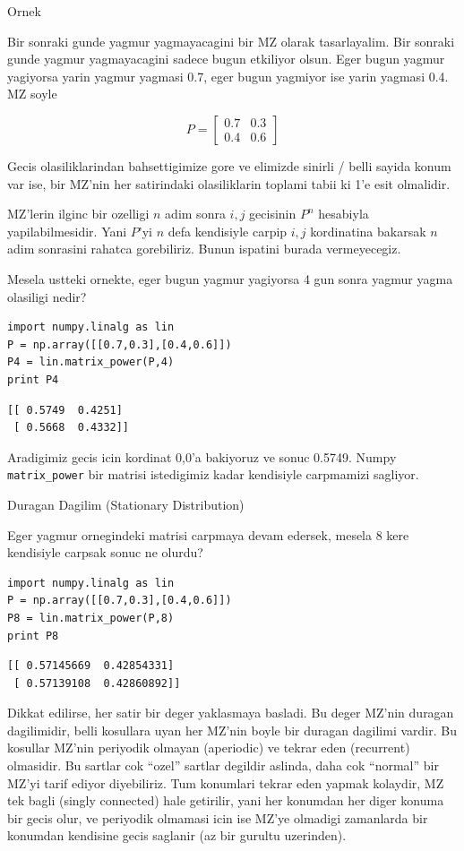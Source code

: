 \documentclass[12pt,fleqn]{article}\usepackage{../common}
\begin{document}
Ornek

Bir sonraki gunde yagmur yagmayacagini bir MZ olarak tasarlayalim. Bir
sonraki gunde yagmur yagmayacagini sadece bugun etkiliyor olsun. Eger bugun
yagmur yagiyorsa yarin yagmur yagmasi 0.7, eger bugun yagmiyor ise yarin
yagmasi 0.4. MZ soyle

$$ 
P =
\left[\begin{array}{cc}
0.7 & 0.3 \\
0.4 & 0.6
\end{array}\right]
 $$

Gecis olasiliklarindan bahsettigimize gore ve elimizde sinirli / belli
sayida konum var ise, bir MZ'nin her satirindaki olasiliklarin toplami
tabii ki 1'e esit olmalidir. 

MZ'lerin ilginc bir ozelligi $n$ adim sonra $i,j$ gecisinin $P^n$ hesabiyla
yapilabilmesidir. Yani $P$'yi $n$ defa kendisiyle carpip $i,j$ kordinatina 
bakarsak $n$ adim sonrasini rahatca gorebiliriz. Bunun ispatini burada
vermeyecegiz. 

Mesela ustteki ornekte, eger bugun yagmur yagiyorsa 4 gun sonra yagmur
yagma olasiligi nedir? 

\begin{verbatim}
import numpy.linalg as lin
P = np.array([[0.7,0.3],[0.4,0.6]])
P4 = lin.matrix_power(P,4)
print P4
\end{verbatim}

\begin{verbatim}
[[ 0.5749  0.4251]
 [ 0.5668  0.4332]]
\end{verbatim}

Aradigimiz gecis icin kordinat 0,0'a bakiyoruz ve sonuc 0.5749. Numpy
\verb!matrix_power! bir matrisi istedigimiz kadar kendisiyle carpmamizi
sagliyor. 

Duragan Dagilim (Stationary Distribution)

Eger yagmur ornegindeki matrisi carpmaya devam edersek, mesela 8 kere
kendisiyle carpsak sonuc ne olurdu? 

\begin{verbatim}
import numpy.linalg as lin
P = np.array([[0.7,0.3],[0.4,0.6]])
P8 = lin.matrix_power(P,8)
print P8
\end{verbatim}

\begin{verbatim}
[[ 0.57145669  0.42854331]
 [ 0.57139108  0.42860892]]
\end{verbatim}

Dikkat edilirse, her satir bir deger yaklasmaya basladi. Bu deger MZ'nin
duragan dagilimidir, belli kosullara uyan her MZ'nin boyle bir duragan
dagilimi vardir. Bu kosullar MZ'nin periyodik olmayan (aperiodic) ve tekrar
eden (recurrent) olmasidir. Bu sartlar cok ``ozel'' sartlar degildir
aslinda, daha cok ``normal'' bir MZ'yi tarif ediyor diyebiliriz. Tum
konumlari tekrar eden yapmak kolaydir, MZ tek bagli (singly connected) hale
getirilir, yani her konumdan her diger konuma bir gecis olur, ve periyodik
olmamasi icin ise MZ'ye olmadigi zamanlarda bir konumdan kendisine gecis
saglanir (az bir gurultu uzerinden). 
\end{document}
